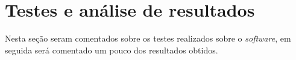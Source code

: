 \chapter{Testes e análise de resultados}
	\label{ch:testes}
Nesta seção seram comentados sobre os testes realizados sobre o \textit{software}, em seguida será comentado um pouco dos resultados obtidos.